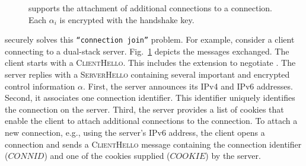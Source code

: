 \begin{figure}[!t]
  \centering
  \caption{\tcpls supports the attachment of additional \tcp
    connections to a \tcpls connection. Each $\alpha_i$ is encrypted with the
    handshake key.}
  \label{fig:join-example}
\end{figure}

\tcpls securely solves this \texttt{``connection join''} problem. For example, consider a client connecting to a dual-stack server. Fig.~\ref{fig:join-example} depicts the \tls messages exchanged.  The client starts with a \textsc{ClientHello}. This includes the \tcpls extension to negotiate \tcpls. The server replies with a \textsc{ServerHello} containing several important and encrypted control information $\alpha$. First, the server announces
its IPv4 and IPv6 addresses. Second, it associates one connection identifier.
This identifier uniquely identifies the connection on the server. Third, the
server provides a list of cookies that enable the client to attach additional
\tcp connections to the \tcpls connection. To attach a new connection, e.g., using the server's IPv6 address, the client opens a \tcp connection and sends a
\textsc{ClientHello} message containing the connection identifier ($CONNID$) and one of the cookies supplied ($COOKIE$) by the server.

